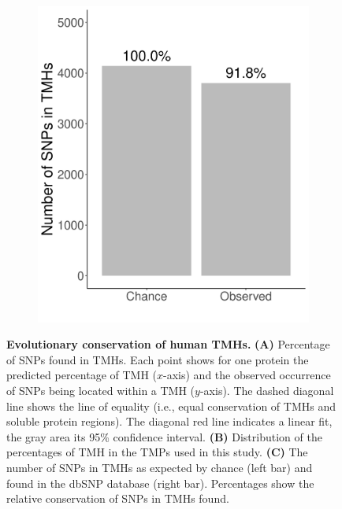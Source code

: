 \begin{figure}[!htbp]
  
   \vfill

  \begin{subfigure}[t]{0.45\textwidth}
    \centering
    \caption{}
    \includegraphics[width=\linewidth]{ncbi_peregrine_results/fig_conservation.png}
    \label{fig:conservation}
  \end{subfigure}


  \caption{ \textbf{Evolutionary conservation of human TMHs.}
    \textbf{(A)} 
    Percentage of SNPs found in TMHs.
    Each point shows for one protein the predicted percentage of
    TMH ($x$-axis) and the observed occurrence of SNPs being located
    within a TMH ($y$-axis).
    The dashed diagonal line shows the line of equality (i.e.,
    equal conservation of TMHs and soluble protein regions). 
    The diagonal red line indicates a linear fit, 
    the gray area its 95\% confidence interval.
    \textbf{(B)}
    Distribution of the percentages of TMH in the TMPs used in this study.
    \textbf{(C)}
    The number of SNPs in TMHs as expected by chance (left bar) 
    and found in the dbSNP database (right bar).
    Percentages show the relative conservation
    of SNPs in TMHs found.
  }
\end{figure}

